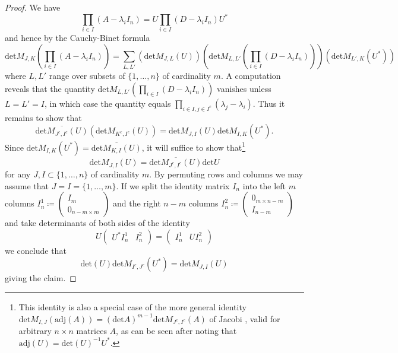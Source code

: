 \documentclass{amsart}
\begin{document}
\begin{proof}  We have 
$$\prod_{i \in I} (A - \lambda_i I_n) = U \prod_{i \in I} (D - \lambda_i I_n) U^*$$
and hence by the Cauchy-Binet formula 
$$\mathrm{det} M_{J,K}( \prod_{i \in I} (A - \lambda_i I_n) ) = \sum_{L,L'} (\mathrm{det} M_{J,L}(U))
(\mathrm{det} M_{L,L'}(\prod_{i \in I} (D - \lambda_i I_n))) (\mathrm{det} M_{L',K}(U^*))$$
where $L,L'$ range over subsets of $\{1,\dots,n\}$ of cardinality $m$.  A computation reveals that the quantity $\mathrm{det} M_{L,L'}(\prod_{i \in I} (D - \lambda_i I_n))$ vanishes unless $L=L'=I$, in which case the quantity equals $\prod_{i \in I, j \in I^c} (\lambda_j - \lambda_i)$.  Thus it remains to show that
$$ \overline{\mathrm{det} M_{J^c,I^c}(U)} (\mathrm{det} M_{K^c,I^c}(U)) = \mathrm{det} M_{J,I}(U) \mathrm{det} M_{I,K}(U^*).$$
Since $\mathrm{det} M_{I,K}(U^*) = \overline{\mathrm{det} M_{K,I}(U)}$, it will suffice to show that\footnote{This identity is also a special case of the more general identity $\mathrm{det} M_{I,J}(\mathrm{adj}(A)) = (\mathrm{det} A)^{m-1} \mathrm{det} M_{J^c,I^c}(A)$ of Jacobi \cite{jacobi}, valid for arbitrary $n \times n$ matrices $A$, as can be seen after noting that $\mathrm{adj}(U) = \mathrm{det}(U)^{-1} U^*$.} 
\begin{equation}\label{duality}
 \mathrm{det} M_{J,I}(U) = \overline{\mathrm{det} M_{J^c,I^c}(U)} \mathrm{det} U
\end{equation}
for any $J,I \subset \{1,\dots,n\}$ of cardinality $m$.  By permuting rows and columns we may assume that $J=I=\{1,\dots,m\}$.  If we split the identity matrix $I_n$ into the left $m$ columns $I_n^1 \coloneqq \begin{pmatrix} I_m \\ 0_{n-m \times m} \end{pmatrix}$ and the right $n-m$ columns $I_n^2 \coloneqq \begin{pmatrix} 0_{m \times n-m} \\ I_{n-m} \end{pmatrix}$ and take determinants of both sides of the identity
$$ U \begin{pmatrix} U^* I_n^1 & I_n^2 \end{pmatrix} = \begin{pmatrix} I_n^1 & UI_n^2 \end{pmatrix}$$
we conclude that
$$ \mathrm{det}(U) \mathrm{det} M_{I^c,J^c}(U^*) = \mathrm{det} M_{J,I}(U)$$
giving the claim.
\end{proof}
\end{document}
